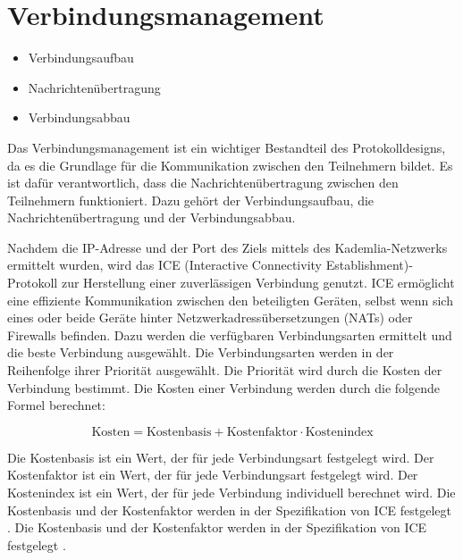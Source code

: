 \section{Verbindungsmanagement}
\label{subsec:routing}

\begin{itemize}
    \item Verbindungsaufbau
    \item Nachrichtenübertragung
    \item Verbindungsabbau
\end{itemize}


\noindent Das Verbindungsmanagement ist ein wichtiger Bestandteil des Protokolldesigns, da es die Grundlage für die Kommunikation zwischen den Teilnehmern bildet. Es ist dafür verantwortlich, dass die Nachrichtenübertragung zwischen den Teilnehmern funktioniert. Dazu gehört der Verbindungsaufbau, die Nachrichtenübertragung und der Verbindungsabbau.

Nachdem die IP-Adresse und der Port des Ziels mittels des Kademlia-Netzwerks ermittelt wurden, wird das ICE (Interactive Connectivity Establishment)-Protokoll zur Herstellung einer zuverlässigen Verbindung genutzt. ICE ermöglicht eine effiziente Kommunikation zwischen den beteiligten Geräten, selbst wenn sich eines oder beide Geräte hinter Netzwerkadressübersetzungen (NATs) oder Firewalls befinden. Dazu werden die verfügbaren Verbindungsarten ermittelt und die beste Verbindung ausgewählt. Die Verbindungsarten werden in der Reihenfolge ihrer Priorität ausgewählt. Die Priorität wird durch die Kosten der Verbindung bestimmt. Die Kosten einer Verbindung werden durch die folgende Formel berechnet:

\begin{equation}
    \label{eq:ice_kosten}
    \text{Kosten} = \text{Kostenbasis} + \text{Kostenfaktor} \cdot \text{Kostenindex}
\end{equation}

\noindent Die Kostenbasis ist ein Wert, der für jede Verbindungsart festgelegt wird. Der Kostenfaktor ist ein Wert, der für jede Verbindungsart festgelegt wird. Der Kostenindex ist ein Wert, der für jede Verbindung individuell berechnet wird. Die Kostenbasis und der Kostenfaktor werden in der Spezifikation von ICE festgelegt \parencite[S. 15]{rfc8445_ice}. Die Kostenbasis und der Kostenfaktor werden in der Spezifikation von ICE festgelegt \parencite[S. 15]{rfc8445_ice}.






